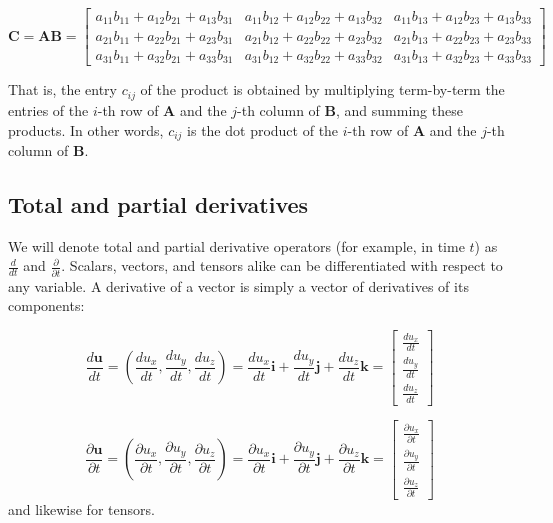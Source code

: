 \documentclass[12pt]{article}
\numberwithin{equation}{section}
\numberwithin{figure}{section}
\numberwithin{table}{section}
\begin{document}
\begin{equation}
  \mathbf{C} = \mathbf{A} \mathbf{B} =
  \begin{bmatrix}
    a_{11} b_{11} + a_{12} b_{21} + a_{13} b_{31} &
    a_{11} b_{12} + a_{12} b_{22} + a_{13} b_{32} &
    a_{11} b_{13} + a_{12} b_{23} + a_{13} b_{33} \\
    a_{21} b_{11} + a_{22} b_{21} + a_{23} b_{31} &
    a_{21} b_{12} + a_{22} b_{22} + a_{23} b_{32} &
    a_{21} b_{13} + a_{22} b_{23} + a_{23} b_{33} \\
    a_{31} b_{11} + a_{32} b_{21} + a_{33} b_{31} &
    a_{31} b_{12} + a_{32} b_{22} + a_{33} b_{32} &
    a_{31} b_{13} + a_{32} b_{23} + a_{33} b_{33}
  \end{bmatrix}
\end{equation}

That is, the entry $c_{ij}$ of the product is obtained by multiplying
term-by-term the entries of the $i$-th row of $\mathbf{A}$ and the $j$-th column
of $\mathbf{B}$, and summing these products.
In other words, $c_{ij}$ is the dot product of the $i$-th row of $\mathbf{A}$
and the $j$-th column of $\mathbf{B}$.

\subsection{Total and partial derivatives}

We will denote total and partial
derivative operators (for example, in time $t$)
as $\frac{d}{dt}$ and $\frac{\partial}{\partial t}$.
Scalars, vectors, and tensors alike can be differentiated with respect to any
variable.
A derivative of a vector is simply a vector of derivatives of its components:

\begin{equation}
  \frac{d\mathbf{u}}{dt}
    = (\frac{d u_x}{d t}, \frac{d u_y}{d t}, \frac{d u_z}{d t})
    = \frac{du_x}{dt} \mathbf{i} + \frac{du_y}{dt} \mathbf{j} + \frac{du_z}{dt} \mathbf{k}
    = \begin{bmatrix}
        \frac{du_x}{dt} \\
        \frac{du_y}{dt} \\
        \frac{du_z}{dt}
      \end{bmatrix}
\end{equation}

\begin{equation}
  \frac{\partial \mathbf{u}}{\partial t}
    = (\frac{\partial u_x}{\partial t}, \frac{\partial u_y}{\partial t}, \frac{\partial u_z}{\partial t})
    = \frac{\partial u_x}{\partial t} \mathbf{i} + \frac{\partial u_y}{\partial t} \mathbf{j} + \frac{\partial u_z}{\partial t} \mathbf{k}
    = \begin{bmatrix}
        \frac{\partial u_x}{\partial t} \\
        \frac{\partial u_y}{\partial t} \\
        \frac{\partial u_z}{\partial t}
      \end{bmatrix}
\end{equation}
and likewise for tensors.\\
\end{document}
